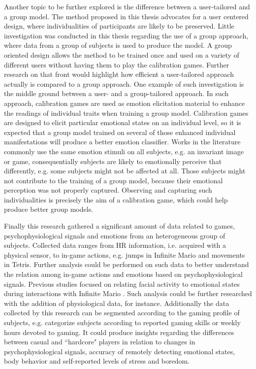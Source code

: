 Another topic to be further explored is the difference between a user-tailored and a group model. The method proposed in this thesis advocates for a user centered design, where individualities of participants are likely to be preserved. Little investigation was conducted in this thesis regarding the use of a group approach, where data from a group of subjects is used to produce the model. A group oriented design allows the method to be trained once and used on a variety of different users without having them to play the calibration games. Further research on that front would highlight how efficient a user-tailored approach actually is compared to a group approach. One example of such investigation is the middle ground between a user- and a group-tailored approach. In such approach, calibration games are used as emotion elicitation material to enhance the readings of individual traits when training a group model. Calibration games are designed to elicit particular emotional states on an individual level, so it is expected that a group model trained on several of those enhanced individual manifestations will produce a better emotion classifier. Works in the literature commonly use the same emotion stimuli on all subjects, e.g. an invariant image or game, consequentially subjects are likely to emotionally perceive that differently, e.g. some subjects might not be affected at all. Those subjects might not contribute to the training of a group model, because their emotional perception was not properly captured. Observing and capturing such individualities is precisely the aim of a calibration game, which could help produce better group models.

Finally this research gathered a significant amount of data related to games, psychophysiological signals and emotions from an heterogeneous group of subjects. Collected data ranges from HR information, i.e. acquired with a physical sensor, to in-game actions, e.g. jumps in Infinite Mario and movements in Tetris. Further analysis could be performed on such data to better understand the relation among in-game actions and emotions based on psychophysiological signals. Previous studies focused on relating facial activity to emotional states during interactions with Infinite Mario \parencite{shaker2011feature}. Such analysis could be further researched with the addition of physiological data, for instance. Additionally the data collected by this research can be segmented according to the gaming profile of subjects, e.g. categorize subjects according to reported gaming skills or weekly hours devoted to gaming. It could produce insights regarding the differences between casual and ``hardcore" players in relation to changes in psychophysiological signals, accuracy of remotely detecting emotional states, body behavior and self-reported levels of stress and boredom.
